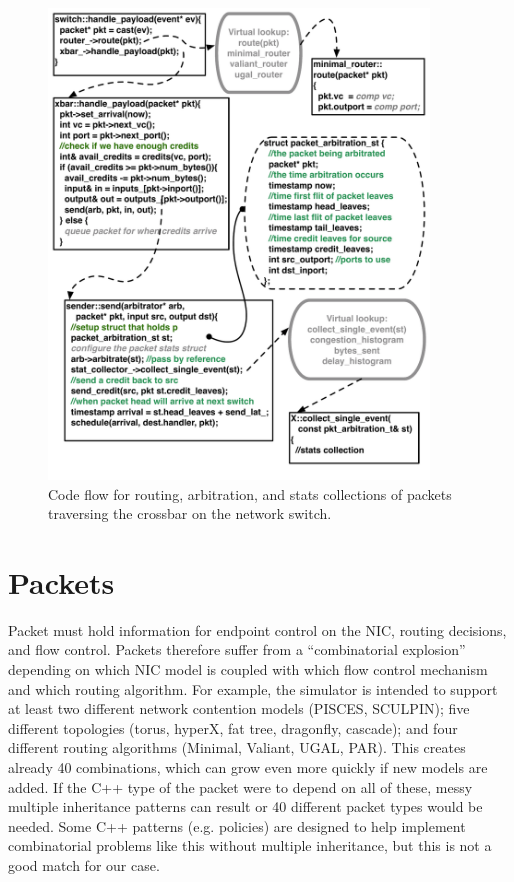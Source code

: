 \begin{figure}
\includegraphics[width=0.9\textwidth]{figures/RoutingFlow}
\caption{Code flow for routing, arbitration, and stats collections of packets traversing the crossbar on the network switch.}
\label{fig:xbarFlow}
\end{figure}

\section{Packets}
Packet must hold information for endpoint control on the NIC, routing decisions, and flow control. 
Packets therefore suffer from a ``combinatorial explosion'' depending on which NIC model is coupled with which flow control mechanism and which routing algorithm.
For example, the simulator is intended to support at least two different network contention models (PISCES, SCULPIN);
five different topologies (torus, hyperX, fat tree, dragonfly, cascade); and four different routing algorithms (Minimal, Valiant, UGAL, PAR).
This creates already 40 combinations, which can grow even more quickly if new models are added.
If the C++ type of the packet were to depend on all of these, messy multiple inheritance patterns can result or 40 different packet types would be needed.
Some C++ patterns (e.g. policies) are designed to help implement combinatorial problems like this without multiple inheritance,
but this is not a good match for our case.

